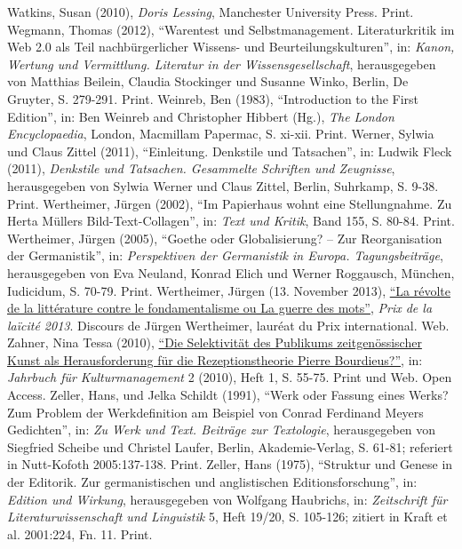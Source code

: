 \documentclass[fontsize=12pt]{scrartcl}
\begin{document}
{{{{\begin{thebibliography}
	Watkins, Susan (2010), \textit{Doris Lessing}, Manchester University Press. Print.
	Wegmann, Thomas (2012), "`Warentest und Selbstmanagement. Li\-te\-ra\-tur\-kritik im Web 2.0 als Teil nachb\"urgerlicher Wissens- und Beurteilungskulturen"', in: \textit{Kanon, Wertung und Ver\-mitt\-lung. Li\-te\-ra\-tur in der Wissensge\-sell\-schaft}, he\-rausgegeben von Matthias Beilein, Claudia Stockinger und Susanne Winko, Berlin, De Gruyter, S. 279-291. Print.
	Weinreb, Ben (1983), "`Introduction to the First Edition"', in: Ben Weinreb and Christopher Hibbert (Hg.), \textit{The London Encyclopaedia}, London, Macmillam Papermac, S. xi-xii. Print.
	Werner, Sylwia und Claus Zittel (2011), "`Einleitung. Denkstile und Tatsachen"', in: Ludwik Fleck (2011), \textit{Denkstile und Tatsachen. Gesammelte Schriften und Zeugnisse}, he\-rausgegeben von Sylwia Werner und Claus Zittel, Berlin, Suhrkamp, S. 9-38. Print.
	Wertheimer, J\"urgen (2002), "`Im Papierhaus wohnt eine Stellungnahme. Zu Herta M\"ullers Bild-Text-Collagen"', in: \textit{Text und Kritik}, Band 155, S. 80-84. Print.
	Wertheimer, J\"urgen (2005), "`Goethe oder Globalisierung? -- Zur Reorganisation der \flq Germanistik\frq"', in: \textit{Perspektiven der Germanistik in Europa. Tagungsbeitr\"age}, he\-rausgegeben von Eva Neuland, Konrad Elich und Werner Roggausch, M\"unchen, Iudicidum, S. 70-79. Print.
	Wertheimer, J\"urgen (13. November 2013), \href{http://www.laicite-republique.org/prix-de-la-laicite-2013-discours-4027.html}{"`La r\'{e}volte de la litt\'{e}rature contre le fondamentalisme ou La guerre des mots"'}, \textit{Prix de la la\"{i}cit\'{e} 2013}. Discours de J\"urgen Wertheimer, laur\'{e}at du Prix international. Web.
	Zahner, Nina Tessa (2010), \href{http://www.fachverband-kulturmanagement.org/wp-content/uploads/2012/10/DieSelektivitätDesPublikumsZeitgenössischerKunst.pdf}{"`Die Selektivit\"at des Publikums zeitgen\"ossischer Kunst als Herausforderung für die Rezeptionstheorie Pierre Bourdieus?"'}, in: \textit{Jahrbuch f\"ur Kulturmanagement} 2 (2010), Heft 1, S. 55-75. Print und Web. Open Access.
	Zeller, Hans, und Jelka Schildt (1991), "`Werk oder Fassung eines Werks? Zum Pro\-blem der Werkdefinition am Beispiel von Conrad Ferdinand Meyers Gedichten"', in: \textit{Zu Werk und Text. Beitr\"age zur Textologie}, he\-rausgegeben von Siegfried Scheibe und Christel Laufer, Berlin, Akademie-Verlag, S. 61-81; referiert in Nutt-Kofoth 2005:137-138. Print.
	Zeller, Hans (1975), "`Struktur und Genese in der Editorik. Zur germanistischen und an\-glistischen Editionsfor\-schung"', in: \textit{Edition und Wirkung}, he\-rausgegeben von Wolfgang Haubrichs, in: \textit{Zeitschrift f\"ur Li\-te\-ra\-tur\-wissenschaft und Linguistik} 5, Heft 19/20, S. 105-126; zitiert in Kraft et al. 2001:224, Fn. 11. Print.
\end{thebibliography}

}}}}
\end{document}
